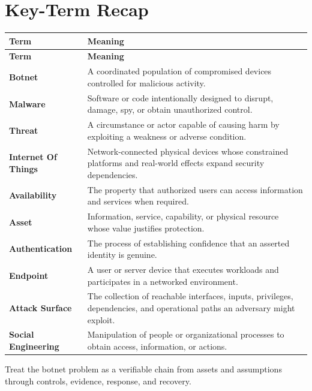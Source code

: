 \documentclass[11pt]{article}
\begin{document}
\section*{Key-Term Recap}
\begin{longtable}{>{\RaggedRight\arraybackslash}p{}>{\RaggedRight\arraybackslash}p{}}
\toprule\rowcolor{Navy}\color{white}\textbf{Term} & \color{white}\textbf{Meaning}\\\midrule
\endfirsthead
\toprule\rowcolor{Navy}\color{white}\textbf{Term} & \color{white}\textbf{Meaning}\\\midrule
\endhead
\textbf{Botnet} & A coordinated population of compromised devices controlled for malicious activity. \\\midrule
\textbf{Malware} & Software or code intentionally designed to disrupt, damage, spy, or obtain unauthorized control. \\\midrule
\textbf{Threat} & A circumstance or actor capable of causing harm by exploiting a weakness or adverse condition. \\\midrule
\textbf{Internet Of Things} & Network-connected physical devices whose constrained platforms and real-world effects expand security dependencies. \\\midrule
\textbf{Availability} & The property that authorized users can access information and services when required. \\\midrule
\textbf{Asset} & Information, service, capability, or physical resource whose value justifies protection. \\\midrule
\textbf{Authentication} & The process of establishing confidence that an asserted identity is genuine. \\\midrule
\textbf{Endpoint} & A user or server device that executes workloads and participates in a networked environment. \\\midrule
\textbf{Attack Surface} & The collection of reachable interfaces, inputs, privileges, dependencies, and operational paths an adversary might exploit. \\\midrule
\textbf{Social Engineering} & Manipulation of people or organizational processes to obtain access, information, or actions. \\\midrule
\bottomrule
\end{longtable}
\begin{takeawaybox}
Treat the botnet problem as a verifiable chain from assets and assumptions through controls, evidence, response, and recovery.
\end{takeawaybox}
\end{document}
